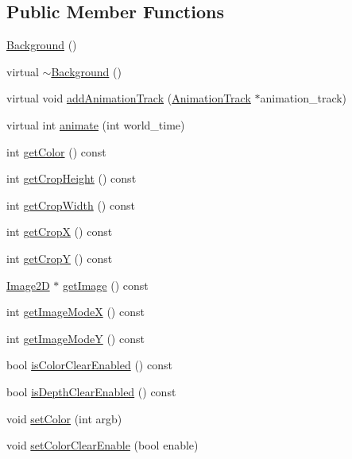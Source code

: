 \subsection*{Public Member Functions}
\begin{CompactItemize}
\item 
\hyperlink{classm3g_1_1Background_2bbc220bb63956558a8603a7909c2bbd}{Background} ()
\item 
virtual \hyperlink{classm3g_1_1Background_b793cb50870532320856acdd2caf84c3}{$\sim$Background} ()
\item 
virtual void \hyperlink{classm3g_1_1Background_415c0b110f95410ded9b85e5d99a496b}{addAnimationTrack} (\hyperlink{classm3g_1_1AnimationTrack}{AnimationTrack} $\ast$animation\_\-track)
\item 
virtual int \hyperlink{classm3g_1_1Background_8aad1ceab4c2a03609c8a42324ce484d}{animate} (int world\_\-time)
\item 
int \hyperlink{classm3g_1_1Background_4cfa1931c265ec3412fe3f6408a1b4f5}{getColor} () const 
\item 
int \hyperlink{classm3g_1_1Background_d6d9d6f23b7bb004c93642bcd081f4a3}{getCropHeight} () const 
\item 
int \hyperlink{classm3g_1_1Background_5c6515f6706675ef31ca5dfa0a03b953}{getCropWidth} () const 
\item 
int \hyperlink{classm3g_1_1Background_d0ba0211183decc8f0459ca598b12912}{getCropX} () const 
\item 
int \hyperlink{classm3g_1_1Background_9ef03b219415a1f08aef6745ad5d87d0}{getCropY} () const 
\item 
\hyperlink{classm3g_1_1Image2D}{Image2D} $\ast$ \hyperlink{classm3g_1_1Background_a8c0193b0e7d47d4b5c9f60df24c44f5}{getImage} () const 
\item 
int \hyperlink{classm3g_1_1Background_0dd60d498f4d50d8808c0b3ad61bc9e8}{getImageModeX} () const 
\item 
int \hyperlink{classm3g_1_1Background_a8d38d66f133ae417956a5dc5f84551d}{getImageModeY} () const 
\item 
bool \hyperlink{classm3g_1_1Background_d6b7bfdf4225b509549e2fbb9575b509}{isColorClearEnabled} () const 
\item 
bool \hyperlink{classm3g_1_1Background_d20a03183cd1c6418dcadf94ac0ca470}{isDepthClearEnabled} () const 
\item 
void \hyperlink{classm3g_1_1Background_38439e862c59a31b90e57c18669061ae}{setColor} (int argb)
\item 
void \hyperlink{classm3g_1_1Background_68e4fe4cf32fe60f166056115081aa65}{setColorClearEnable} (bool enable)

\end{CompactItemize}
